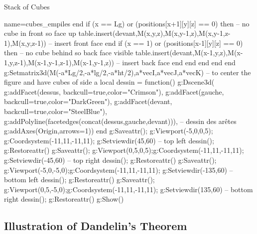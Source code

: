 \begin{demo}{Stack of Cubes}
\begin{luadraw}{name=cubes_empiles}
                end                    
                if (x == Lg) or (positions[x+1][y][z] == 0) then -- no cube in front so face up
                    table.insert(devant,{M(x,y,z),M(x,y-1,z),M(x,y-1,z-1),M(x,y,z-1)}) -- insert front face
                end
                if (x == 1) or (positions[x-1][y][z] == 0) then -- no cube behind so back face visible
                    table.insert(devant,{M(x-1,y,z),M(x-1,y,z-1),M(x-1,y-1,z-1),M(x-1,y-1,z)}) -- insert back face
                end
            end
        end
    end
end
g:Setmatrix3d({M(-a*Lg/2,-a*lg/2,-a*ht/2),a*vecI,a*vecJ,a*vecK}) -- to center the figure and have cubes of side a
local dessin = function()
    g:Dscene3d(
        g:addFacet(dessus, {backcull=true,color="Crimson"}), g:addFacet(gauche, {backcull=true,color="DarkGreen"}),
        g:addFacet(devant, {backcull=true,color="SteelBlue"}),
        g:addPolyline(facetedges(concat(dessus,gauche,devant))), -- dessin des arêtes
        g:addAxes(Origin,{arrows=1}))
end
g:Saveattr(); g:Viewport(-5,0,0,5); g:Coordsystem(-11,11,-11,11); g:Setviewdir(45,60) -- top left
 dessin(); g:Restoreattr()
g:Saveattr(); g:Viewport(0,5,0,5);g:Coordsystem(-11,11,-11,11); g:Setviewdir(-45,60) -- top right
dessin(); g:Restoreattr()
g:Saveattr(); g:Viewport(-5,0,-5,0);g:Coordsystem(-11,11,-11,11); g:Setviewdir(-135,60) -- bottom left
dessin(); g:Restoreattr()
g:Saveattr(); g:Viewport(0,5,-5,0);g:Coordsystem(-11,11,-11,11); g:Setviewdir(135,60) -- bottom right
dessin(); g:Restoreattr()
g:Show()
\end{luadraw}
\end{demo}


\subsection{Illustration of Dandelin's Theorem}


